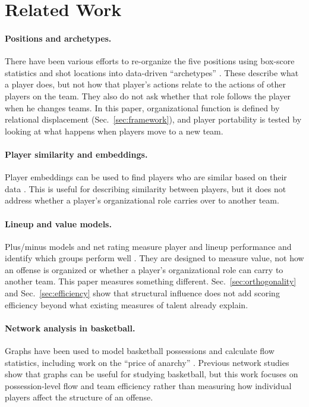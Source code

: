 \documentclass[11pt]{article}
\begin{document}
\section{Related Work}
\label{sec:related}

\paragraph{Positions and archetypes.}
There have been various efforts to re-organize the five positions using box-score statistics
and shot locations into data-driven ``archetypes''
\citep{lutz2012cluster,alagappan2012positions}. These describe what a player does, but not
how that player's actions relate to the actions of other players on the team. They also do
not ask whether that role follows the player when he changes teams. In this paper,
organizational function is defined by relational displacement (Sec.~\ref{sec:framework}),
and player portability is tested by looking at what happens when players move to a new team.

\paragraph{Player similarity and embeddings.}
Player embeddings can be used to find players who are similar based on their data
\citep{sill2010winval}. This is useful for describing similarity between players, but it does
not address whether a player's organizational role carries over to another team.

\paragraph{Lineup and value models.}
Plus/minus models and net rating measure player and lineup performance and identify which
groups perform well \citep{rosenbaum2004apm, sill2010winval}. They are designed to measure
value, not how an offense is organized or whether a player's organizational role can carry
to another team. This paper measures something different. Sec.~\ref{sec:orthogonality} and
Sec.~\ref{sec:efficiency} show that structural influence does not add scoring efficiency
beyond what existing measures of talent already explain.

\paragraph{Network analysis in basketball.}
Graphs have been used to model basketball possessions and calculate flow statistics,
including work on the ``price of anarchy'' \citep{fewell2012basketball, skinner2010anarchy}.
Previous network studies show that graphs can be useful for studying basketball, but this
work focuses on possession-level flow and team efficiency rather than measuring how
individual players affect the structure of an offense.
\end{document}
